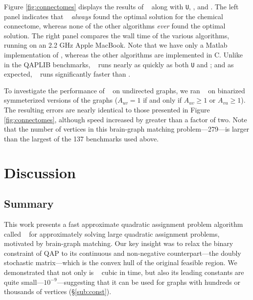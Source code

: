 \documentclass[preprint,11pt]{elsarticle}
\begin{document}
Figure \ref{fig:connectomes} displays the results of \FAQ~ along with \texttt{U}, \Qcv,  and \Path.  The left panel indicates that \FAQ~ \emph{always} found the optimal solution for the chemical connectome, whereas none of the other algorithms \emph{ever} found the optimal solution.  The right panel compares the wall time of the various algorithms, running on an 2.2 GHz Apple MacBook. Note that we have only a Matlab implementation of \FAQ, whereas the other algorithms are implemented in C.  Unlike in the QAPLIB benchmarks, \FAQ~ runs nearly as quickly as both \texttt{U} and \Qcv; and as expected, \FAQ~ runs significantly faster than \Path.  



To investigate the performance of \FAQ~ on undirected graphs, we ran \FAQ~ on binarized symmeterized versions of the graphs ($A_{uv}=1$ if and only if $A_{uv}\geq 1$ or $A_{vu} \geq 1$).  The resulting errors are nearly identical to those presented in Figure \ref{fig:connectomes}, although speed increased by greater than a factor of two. Note that the number of vertices in this brain-graph matching problem---279---is larger than the largest of the 137 benchmarks used above. 




\section{Discussion}
\label{sec:discussion}

\subsection{Summary}

This work presents a fast approximate quadratic assignment problem algorithm called \FAQ~ for approximately solving large quadratic assignment problems, motivated by brain-graph matching.  Our key insight was to relax the binary constraint of QAP to its continuous and non-negative counterpart---the doubly stochastic matrix---which is the convex hull of the original feasible region.  
We demonstrated that not only is \FAQ~ cubic in time, but also its leading constants are quite small---$10^{-9}$---suggesting that it can be used for graphs with hundreds or thousands of vertices (\S \ref{sub:const}).  
\end{document}
